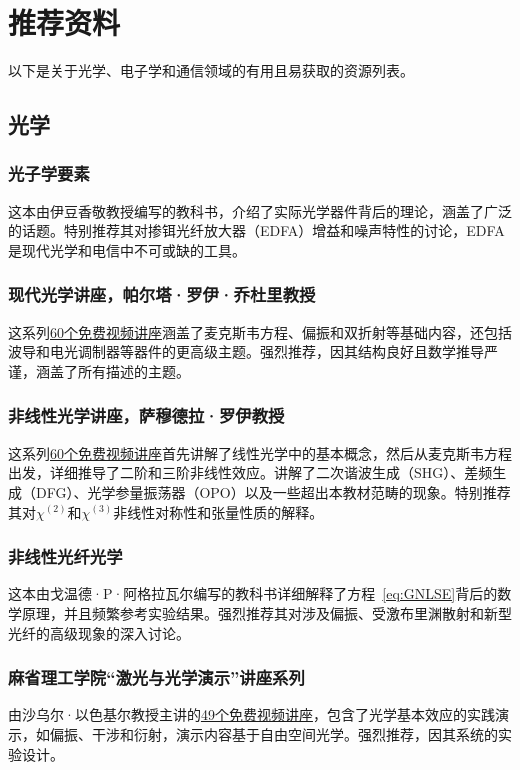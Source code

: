\chapter{推荐资料}
\label{ch:material}
以下是关于光学、电子学和通信领域的有用且易获取的资源列表。

\section{光学}

\subsection*{光子学要素}
这本由伊豆香敬教授编写的教科书，介绍了实际光学器件背后的理论，涵盖了广泛的话题。特别推荐其对掺铒光纤放大器（EDFA）增益和噪声特性的讨论，EDFA是现代光学和电信中不可或缺的工具。

\subsection*{现代光学讲座，帕尔塔·罗伊·乔杜里教授}
这系列\href{https://www.youtube.com/watch?v=2WiMeh1Dxl8&list=PLbRMhDVUMngePMuAGeAUeGVuZffTFY-5i}{60个免费视频讲座}涵盖了麦克斯韦方程、偏振和双折射等基础内容，还包括波导和电光调制器等器件的更高级主题。强烈推荐，因其结构良好且数学推导严谨，涵盖了所有描述的主题。

\subsection*{非线性光学讲座，萨穆德拉·罗伊教授}
这系列\href{https://www.youtube.com/watch?v=EiIDScj124Q&list=PLbRMhDVUMngfBwyonVP8VIsabtnsV3GVv}{60个免费视频讲座}首先讲解了线性光学中的基本概念，然后从麦克斯韦方程出发，详细推导了二阶和三阶非线性效应。讲解了二次谐波生成（SHG）、差频生成（DFG）、光学参量振荡器（OPO）以及一些超出本教材范畴的现象。特别推荐其对$\chi^{(2)}$和$\chi^{(3)}$非线性对称性和张量性质的解释。

\subsection*{非线性光纤光学}
这本由戈温德·P·阿格拉瓦尔编写的教科书详细解释了方程~\ref{eq:GNLSE}背后的数学原理，并且频繁参考实验结果。强烈推荐其对涉及偏振、受激布里渊散射和新型光纤的高级现象的深入讨论。

\subsection*{麻省理工学院“激光与光学演示”讲座系列}
由沙乌尔·以色基尔教授主讲的\href{https://www.youtube.com/watch?v=1cEXNLP5uE0&list=PL4E7FAAD67B171EBC}{49个免费视频讲座}，包含了光学基本效应的实践演示，如偏振、干涉和衍射，演示内容基于自由空间光学。强烈推荐，因其系统的实验设计。

